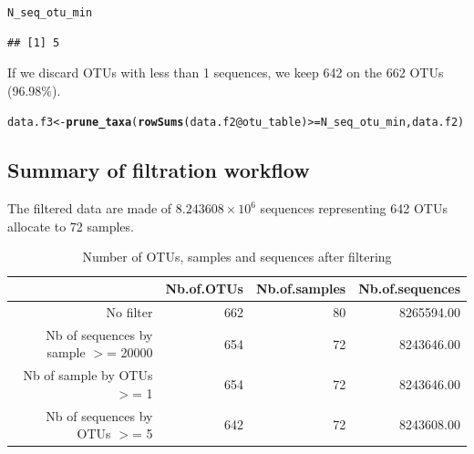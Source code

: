 \documentclass[12pt]{article}\usepackage[]{graphicx}\usepackage[]{color}
\makeatletter
\newcommand{\hlopt}[1]{\textcolor[rgb]{0,0,0}{#1}}%
\newcommand{\hlstd}[1]{\textcolor[rgb]{0.345,0.345,0.345}{#1}}%
\newcommand{\hlkwb}[1]{\textcolor[rgb]{0.69,0.353,0.396}{#1}}%
\newcommand{\hlkwc}[1]{\textcolor[rgb]{0.333,0.667,0.333}{#1}}%
\newcommand{\hlkwd}[1]{\textcolor[rgb]{0.737,0.353,0.396}{\textbf{#1}}}%
\newenvironment{kframe}{%
 \def\at@end@of@kframe{}%
 \ifinner\ifhmode%
  \def\at@end@of@kframe{\end{minipage}}%
  \begin{minipage}{\columnwidth}%
 \fi\fi%
 \def\FrameCommand##1{\hskip\@totalleftmargin \hskip-\fboxsep
 \colorbox{shadecolor}{##1}\hskip-\fboxsep
     \hskip-\linewidth \hskip-\@totalleftmargin \hskip\columnwidth}%
 \MakeFramed {\advance\hsize-\width
   \@totalleftmargin\z@ \linewidth\hsize
   \@setminipage}}%
 {\par\unskip\endMakeFramed%
 \at@end@of@kframe}
\newenvironment{knitrout}{}{} %
\numberwithin{figure}{section}
\makeatother
\begin{document}
\begin{knitrout}\small
{}\color{fgcolor}\begin{kframe}
\begin{alltt}
\hlstd{N_seq_otu_min}
\end{alltt}
\begin{verbatim}
## [1] 5
\end{verbatim}
\end{kframe}
\end{knitrout}

If we discard OTUs with less than 1 sequences, we keep 642 on the 662 OTUs (96.98\%).

\begin{knitrout}\small
{}\color{fgcolor}\begin{kframe}
\begin{alltt}
\hlstd{data.f3} \hlkwb{<-} \hlkwd{prune_taxa}\hlstd{(}\hlkwd{rowSums}\hlstd{(data.f2}\hlopt{@}\hlkwc{otu_table}\hlstd{)} \hlopt{>=} \hlstd{N_seq_otu_min, data.f2)}
\end{alltt}
\end{kframe}
\end{knitrout}

\subsection{Summary of filtration workflow}

The filtered data are made of \ensuremath{8.243608\times 10^{6}} sequences representing 642 OTUs allocate to 72 samples.




\begin{table}[ht]
\centering
\begin{tabular}{rrrr}
  \hline
 & Nb.of.OTUs & Nb.of.samples & Nb.of.sequences \\ 
  \hline
No filter & 662 &  80 & 8265594.00 \\ 
  Nb of sequences by sample $>$=  20000 & 654 &  72 & 8243646.00 \\ 
  Nb of sample by OTUs $>$=  1 & 654 &  72 & 8243646.00 \\ 
  Nb of sequences by OTUs $>$=  5 & 642 &  72 & 8243608.00 \\ 
   \hline
\end{tabular}
\caption{Number of OTUs, samples and sequences after filtering} 
\end{table}
\end{document}
